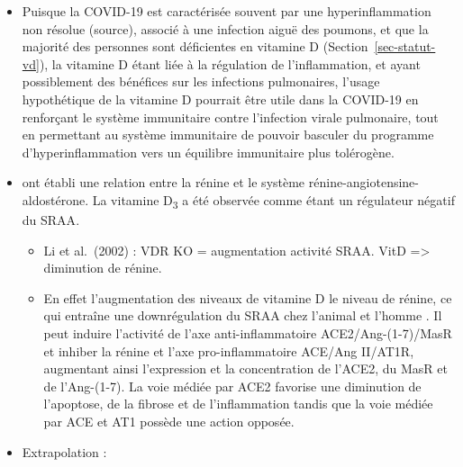 \documentclass[
  a4paper,
  DIV=11,
  numbers=noendperiod,
  listof=totoc]{scrreprt}
\begin{document}
\begin{itemize}
\item
  Puisque la \ac{COVID-19} est caractérisée souvent par une
  hyperinflammation non résolue (source), associé à une infection aiguë
  des poumons, et que la majorité des personnes sont déficientes en
  vitamine D (Section~\ref{sec-statut-vd}), la vitamine D étant liée à
  la régulation de l'inflammation, et ayant possiblement des bénéfices
  sur les infections pulmonaires, l'usage hypothétique de la vitamine D
  pourrait être utile dans la \ac{COVID-19} en renforçant le système
  immunitaire contre l'infection virale pulmonaire, tout en permettant
  au système immunitaire de pouvoir basculer du programme
  d'hyperinflammation vers un équilibre immunitaire plus tolérogène.
\item
  \textcite{Li.2002} ont établi une relation entre la rénine et le
  système rénine-angiotensine-aldostérone. La vitamine
  D\textsubscript{3} a été observée comme étant un régulateur négatif du
  \ac{SRAA}.

  \begin{itemize}
  \item
    Li et al.~(2002) : VDR KO = augmentation activité SRAA. VitD
    =\textgreater{} diminution de rénine.
  \item
    En effet l'augmentation des niveaux de vitamine D le niveau de
    rénine, ce qui entraîne une downrégulation du \ac{SRAA} chez
    l'animal et l'homme \autocite{Li.2004,Schwalfenberg.2007}. Il peut
    induire l'activité de l'axe anti-inflammatoire ACE2/Ang-(1-7)/MasR
    et inhiber la rénine et l'axe pro-inflammatoire ACE/Ang II/AT1R,
    augmentant ainsi l'expression et la concentration de l'ACE2, du MasR
    et de l'Ang-(1-7). La voie médiée par \ac{ACE2} favorise une
    diminution de l'apoptose, de la fibrose et de l'inflammation tandis
    que la voie médiée par ACE et AT1 possède une action opposée.
  \end{itemize}
\item
  Extrapolation :


\end{itemize}
\end{document}
